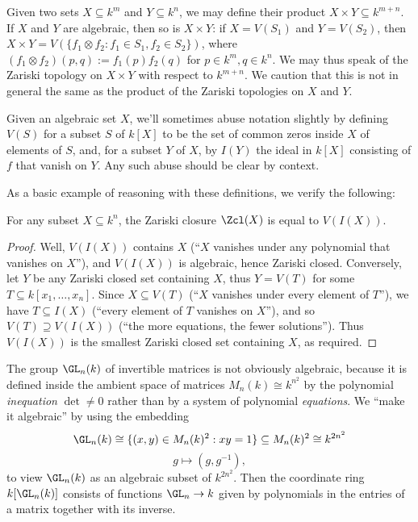 \documentclass[reqno]{amsart} 
\begin{document}
Given two sets $X \subseteq k^m$ and $Y \subseteq k^n$, we may define their product $X \times Y \subseteq k^{m+n}$.  If $X$ and $Y$ are algebraic, then so is $X \times Y$: if $X = V(S_1)$ and $Y = V(S_2)$, then $X \times Y = V(\{f_1 \otimes f_2 : f_1 \in S_1, f_2 \in S_2\})$, where $(f_1 \otimes f_2)(p,q) := f_1(p) f_2(q)$ for $p \in k^m, q \in k^n$.  We may thus speak of the Zariski topology on $X \times Y$ with respect to $k^{m + n}$.  We caution that this is not in general the same as the product of the Zariski topologies on $X$ and $Y$.

Given an algebraic set $X$, we'll sometimes abuse notation slightly by defining $V(S)$ for a subset $S$ of $k[X]$ to be the set of common zeros inside $X$ of elements of $S$, and, for a subset $Y$ of $X$, by $I(Y)$ the ideal in $k[X]$ consisting of $f$ that vanish on $Y$.  Any such abuse should be clear by context.

As a basic example of reasoning with these definitions, we verify the following:
\begin{lemma}
  For any subset $X \subseteq k^n$, the Zariski closure $\Zcl(X)$ is equal to $V(I(X))$.
\end{lemma}
\begin{proof}
  Well, $V(I(X))$ contains $X$ (``$X$ vanishes under any polynomial that vanishes on $X$''), and $V(I(X))$ is algebraic, hence Zariski closed.  Conversely, let $Y$ be any Zariski closed set containing $X$, thus $Y = V(T)$ for some $T \subseteq k[x_1,\dotsc,x_n]$.  Since $X \subseteq V(T)$ (``$X$ vanishes under every element of $T$''), we have $T \subseteq I(X)$ (``every element of $T$ vanishes on $X$''), and so $V(T) \supseteq V(I(X))$ (``the more equations, the fewer solutions'').  Thus $V(I(X))$ is the smallest Zariski closed set containing $X$, as required.
\end{proof}

The group $\GL_n(k)$ of invertible matrices is not obviously algebraic, because it is defined inside the ambient space of matrices $M_n(k) \cong k^{n^2}$ by the polynomial \emph{inequation} $\det \neq 0$ rather than by a system of polynomial \emph{equations}.  We ``make it algebraic'' by using the embedding
\begin{equation*}
  \GL_n(k) \cong \{(x,y) \in M_n(k)^2 : x y = 1 \} \subseteq M_n(k)^2 \cong k^{2 n^2}
\end{equation*}
\begin{equation*}
  g \mapsto (g, g^{-1}),
\end{equation*}
to view $\GL_n(k)$ as an algebraic subset of $k^{2 n^2}$.  Then the coordinate ring $k[\GL_n(k)]$ consists of functions $\GL_n \rightarrow k$ given by polynomials in the entries of a matrix together with its inverse.
\end{document}
